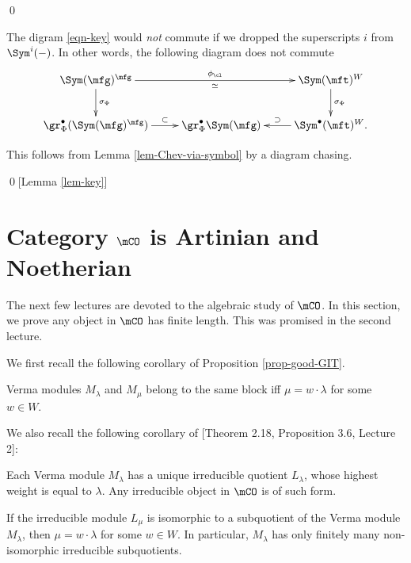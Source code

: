 		\qed

	\begin{warn}
			The digram \eqref{eqn-key} would \emph{not} commute if we dropped the superscripts $i$ from $\Sym^i(-)$. In other words, the following diagram does not commute
			\[
			\xymatrix{
				\Sym(\mfg)^\mfg \ar[d]^-{\sigma_\Phi} \ar[rr]^-{\phi_\cl}_-\simeq
				& 
				& \Sym(\mft)^W  \ar[d]^-{\sigma_\Phi} \\
				\gr_\Phi^\bullet(\Sym(\mfg)^\mfg) \ar[r]^-\subset
				& \gr_\Phi^\bullet \Sym(\mfg) 
				& \Sym^\bullet(\mft)^W. \ar[l]_-\supset
			}
			\]
	\end{warn}


		This follows from Lemma \ref{lem-Chev-via-symbol} by a diagram chasing.

	\qed[Lemma \ref{lem-key}]



\section{Category \texorpdfstring{$\mCO$}{O} is Artinian and Noetherian}

	The next few lectures are devoted to the algebraic study of $\mCO$. In this section, we prove any object in $\mCO$ has finite length. This was promised in the second lecture.

	We first recall the following corollary of Proposition \ref{prop-good-GIT}.

	\begin{prop}
		Verma modules $M_\lambda$ and $M_\mu$ belong to the same block iff $\mu = w\cdot \lambda$ for some $w\in W$.
	\end{prop}

	We also recall the following corollary of [Theorem 2.18, Proposition 3.6, Lecture 2]:

	\begin{prop}
		Each Verma module $M_\lambda$ has a unique irreducible quotient $L_\lambda$, whose highest weight is equal to $\lambda$. Any irreducible object in $\mCO$ is of such form.
	\end{prop}

	\begin{cor}
		\label{cor-irresubq-of-Verma}
		If the irreducible module $L_\mu$ is isomorphic to a subquotient of the Verma module $M_\lambda$, then $\mu = w\cdot \lambda$ for some $w\in W$. In particular, $M_\lambda$ has only finitely many non-isomorphic irreducible subquotients.
	\end{cor}

